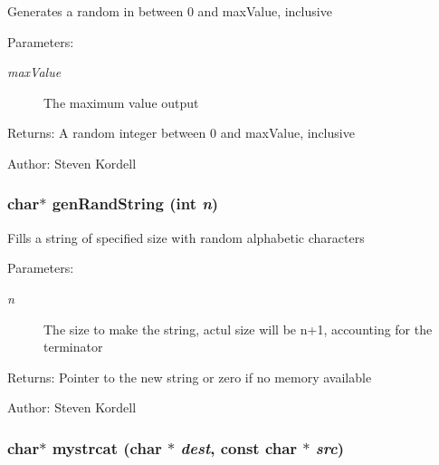 Generates a random in between 0 and max\-Value, inclusive \begin{Desc}
\item[Parameters:]
\begin{description}
\item[{\em max\-Value}]The maximum value output \end{description}
\end{Desc}
\begin{Desc}
\item[Returns:]A random integer between 0 and max\-Value, inclusive \end{Desc}
\begin{Desc}
\item[Author:]Steven Kordell \end{Desc}
\subsubsection{\setlength{\rightskip}{0pt plus 5cm}char$\ast$ gen\-Rand\-String (int {\em n})}\label{mystringbackup_8c_6d35dbb5801b4a0118ee8fca9413285a}


Fills a string of specified size with random alphabetic characters \begin{Desc}
\item[Parameters:]
\begin{description}
\item[{\em n}]The size to make the string, actul size will be n+1, accounting for the terminator \end{description}
\end{Desc}
\begin{Desc}
\item[Returns:]Pointer to the new string or zero if no memory available \end{Desc}
\begin{Desc}
\item[Author:]Steven Kordell \end{Desc}
\subsubsection{\setlength{\rightskip}{0pt plus 5cm}char$\ast$ mystrcat (char $\ast$ {\em dest}, const char $\ast$ {\em src})}\label{mystringbackup_8c_2cb0b44ce485a993e756027da5de81f5}


